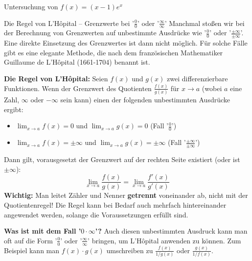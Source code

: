 \begin{beispielumgebung}{Untersuchung von $f(x) = (x-1)e^x$}
\begin{enumerate}
\begin{center}
            \label{fig:kurvendisk_ex_polynom}
        \end{center}
\end{enumerate}
\end{beispielumgebung}



\begin{infoboxumgebung}{Die Regel von L'Hôpital – Grenzwerte bei '$\frac{0}{0}$' oder '$\frac{\infty}{\infty}$'}
Manchmal stoßen wir bei der Berechnung von Grenzwerten auf unbestimmte Ausdrücke wie '$\frac{0}{0}$' oder '$\frac{\pm\infty}{\pm\infty}$'. Eine direkte Einsetzung des Grenzwertes ist dann nicht möglich. Für solche Fälle gibt es eine elegante Methode, die nach dem französischen Mathematiker Guillaume de L'Hôpital (1661-1704) benannt ist.

\textbf{Die Regel von L'Hôpital:}
Seien $f(x)$ und $g(x)$ zwei differenzierbare Funktionen. Wenn der Grenzwert des Quotienten $\frac{f(x)}{g(x)}$ für $x \to a$ (wobei $a$ eine Zahl, $\infty$ oder $-\infty$ sein kann) einen der folgenden unbestimmten Ausdrücke ergibt:
\begin{itemize}
    \item $\lim_{x \to a} f(x) = 0$ und $\lim_{x \to a} g(x) = 0$ (Fall '$\frac{0}{0}$')
    \item $\lim_{x \to a} f(x) = \pm\infty$ und $\lim_{x \to a} g(x) = \pm\infty$ (Fall '$\frac{\pm\infty}{\pm\infty}$')
\end{itemize}
Dann gilt, vorausgesetzt der Grenzwert auf der rechten Seite existiert (oder ist $\pm\infty$):
\[ \lim_{x \to a} \frac{f(x)}{g(x)} = \lim_{x \to a} \frac{f'(x)}{g'(x)} \]
\textbf{Wichtig:} Man leitet Zähler und Nenner \textbf{getrennt} voneinander ab, nicht mit der Quotientenregel! Die Regel kann bei Bedarf auch mehrfach hintereinander angewendet werden, solange die Voraussetzungen erfüllt sind.

\textbf{Was ist mit dem Fall '$0 \cdot \infty$'?}
Auch diesen unbestimmten Ausdruck kann man oft auf die Form '$\frac{0}{0}$' oder '$\frac{\infty}{\infty}$' bringen, um L'Hôpital anwenden zu können. Zum Beispiel kann man $f(x) \cdot g(x)$ umschreiben zu $\frac{f(x)}{1/g(x)}$ oder $\frac{g(x)}{1/f(x)}$.


\end{infoboxumgebung}
